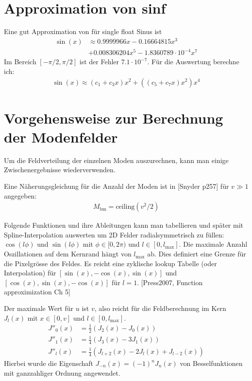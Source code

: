 \documentclass[DIV19,twocolumn]{scrartcl}
\def\({\left(}
\def\){\right)}
\newcommand{\lmax}{l_\textrm{max}}
\begin{document}
\section{Approximation von sinf}
Eine gut Approximation von f\"ur single float Sinus ist
\begin{align}
  \sin(x)&\approx 0.9999966 x -0.16664815 x^3 \nonumber\\
  &+0.008306204 x^5 -1.8360789\cdot 10^{-4} x^7 
\end{align}
Im Bereich $[-\pi/2,\pi/2]$ ist der Fehler $7.1\cdot 10^{-7}$.
F\"ur die Auswertung berechne ich:
\begin{align}
  \sin(x) \approx (c_1 + c_3 x) x^2 + ( (c_5 +c_7 x)x^2) x^4
\end{align}


\section{Vorgehensweise zur Berechnung der Modenfelder}
Um die Feldverteilung der einzelnen Moden auszurechnen, kann man
einige Zwischenergebnisse wiederverwenden.

Eine N\"aherungsgleichung f\"ur die Anzahl der Moden ist in [Snyder
p257] f\"ur $v\gg 1$ angegeben:
\begin{align}
  M_\textrm{bm} = \textrm{ceiling}\(v^2/2\)
\end{align}

Folgende Funktionen und ihre Ableitungen kann man tabellieren und
sp\"ater mit Spline-Interpolation auswerten um 2D Felder
radialsymmetrisch zu f\"ullen: $\cos(l\phi)$ und $\sin(l\phi)$ mit
$\phi\in[0,2\pi)$ und $l\in[0,\lmax]$. Die maximale Anzahl
Oszillationen auf dem Kernrand h\"angt von $\lmax$ ab. Dies definiert
eine Grenze f\"ur die Pixelgr\"osse des Feldes. Es reicht eine
zyklische lookup Tabelle (oder Interpolation) f\"ur
$[\sin(x),-\cos(x),\sin(x)]$ und $[\cos(x),\sin(x),-\cos(x)]$ f\"ur $l=1$.
[Press2007, Function approximization Ch 5]


Der maximale Wert f\"ur $u$ ist $v$, also reicht f\"ur die
Feldberechnung im Kern $J_l(x)$ mit
$x\in[0,v]$ und $l\in[0,\lmax]$. 
\begin{align}
  J''_0(x) &= \frac{1}{2}\(J_2(x)-J_0(x)\)\\
  J''_1(x) &= \frac{1}{4}\(J_3(x)-3J_1(x)\)\\
  J''_l(x) &= \frac{1}{4}\(J_{l+2}(x)-2J_l(x)+J_{l-2}(x)\)
\end{align}
Hierbei wurde die Eigenschaft $J_{-n}(x) = (-1)^n J_n(x)$ von
Besselfunktionen mit ganzzahliger Ordnung angewendet.
\end{document}
